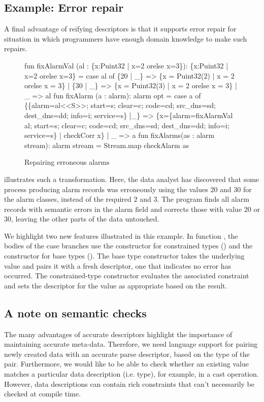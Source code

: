 \subsection{Example: Error repair}
A final advantage of reifying descriptors is that it supports error repair for situation in which programmers have enough domain knowledge to make such repairs.
\begin{figure}
  \centering
\begin{code}
fun fixAlarmVal (al : \{x:Puint32 | x=2 orelse x=3\}): 
  \{x:Puint32 | x=2 orelse x=3\} =
    case al of
      \{20 | _\} => \{x = Puint32(2) | x = 2 orelse x = 3\}
    | \{30 | _\} => \{x = Puint32(3) | x = 2 orelse x = 3\}
    | _ => al
\mbox{}
fun fixAlarm (a : alarm): alarm opt =
    case a of 
	\{\{alarm=al<<S>>; start=s; clear=c; 
          code=cd; src_dns=sd; dest_dns=dd; 
	  info=i; service=s\} |_\} 
          => \{x=\{alarm=fixAlarmVal al; 
                 start=s; clear=c; 
                 code=cd; src_dns=sd; dest_dns=dd; 
                 info=i; service=s\}
              | checkCorr x\} 
      | _ => a
\mbox{}
fun fixAlarms(as : alarm stream): alarm stream =
    Stream.map checkAlarm as
\end{code}
  \caption{Repairing erroneous alarms}
  \label{fig:ex-error-repair}
\end{figure}


 illustrates such a transformation.
Here, the data analyst
has discovered that some process producing alarm records was
erroneously using the values $20$ and $30$ for the alarm classes,
instead of the required $2$ and $3$. The program finds all alarm
records with semantic errors in the alarm field and corrects those
with value $20$ or $30$, leaving the other parts of the data untouched. 

We highlight two new \datatype{} features illustrated in this example. In function , the bodies of the case
branches use the constructor for constrained types () and the
constructor for base types ().  The base type constructor takes the underlying value and pairs it with a fresh descriptor, one that indicates no error has occurred.  The constrained-type constructor evaluates the associated constraint and sets the descriptor for the value as appropriate based on the result.


\subsection{A note on semantic checks}
The many advantages of accurate descriptors highlight the
importance of maintaining accurate meta-data. Therefore, we need
language support for pairing newly created data with an accurate parse
descriptor, based on the type of the pair. Furthermore, we would like
to be able to check whether an existing value matches a particular
data description (i.e. type), for example, in a cast operation.
However, data descriptions can contain rich constraints that can't
necessarily be checked at compile time.

